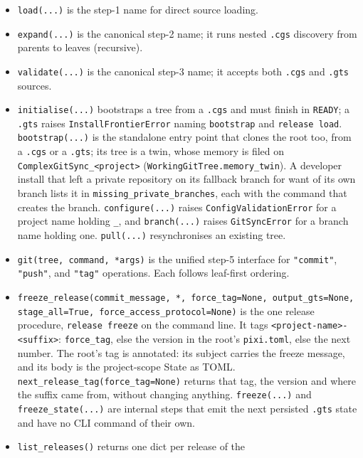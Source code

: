 \begin{itemize}
  \item \texttt{load(...)} is the step-1 name for direct source loading.
  \item \texttt{expand(...)} is the canonical step-2 name; it runs nested
    \texttt{.cgs} discovery from parents to leaves (recursive).
  \item \texttt{validate(...)} is the canonical step-3 name; it accepts both
    \texttt{.cgs} and \texttt{.gts} sources.
  \item \texttt{initialise(...)} bootstraps a tree from a \texttt{.cgs} and
    must finish in \texttt{READY}; a \texttt{.gts} raises
    \texttt{InstallFrontierError} naming \texttt{bootstrap} and
    \texttt{release load}. \texttt{bootstrap(...)} is the standalone entry
    point that clones the root too, from a \texttt{.cgs} or a \texttt{.gts};
    its tree is a twin, whose memory is filed on
    \texttt{ComplexGitSync\_<project>} (\texttt{WorkingGitTree.memory\_twin}).
    A developer install that left a private repository on its fallback branch
    for want of its own branch lists it in
    \texttt{missing\_private\_branches}, each with the command that creates
    the branch. \texttt{configure(...)} raises
    \texttt{ConfigValidationError} for a project name holding \texttt{\_},
    and \texttt{branch(...)} raises \texttt{GitSyncError} for a branch name
    holding one. \texttt{pull(...)} resynchronises an existing tree.
  \item \texttt{git(tree, command, *args)} is the unified step-5 interface for
    \texttt{"commit"}, \texttt{"push"}, and \texttt{"tag"} operations.  Each
    follows leaf-first ordering.
  \item \texttt{freeze\_release(commit\_message, *, force\_tag=None,
    output\_gts=None, stage\_all=True, force\_access\_protocol=None)} is the
    one release procedure, \texttt{release freeze} on the command line. It
    tags \texttt{<project-name>-<suffix>}: \texttt{force\_tag}, else the
    version in the root's \texttt{pixi.toml}, else the next number. The
    root's tag is annotated: its subject carries the freeze message, and
    its body is the project-scope State as TOML.
    \texttt{next\_release\_tag(force\_tag=None)} returns that tag, the
    version and where the suffix came from, without changing anything.
    \texttt{freeze(...)} and \texttt{freeze\_state(...)} are internal steps
    that emit the next persisted \texttt{.gts} state and have no CLI command
    of their own.
  \item \texttt{list\_releases()} returns one dict per release of the

\end{itemize}
